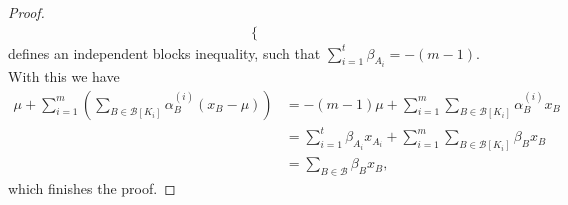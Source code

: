 \documentclass[10pt,a4paper]{amsart}
\newcommand{\B}{\mathcal{B}}
\begin{document}
\begin{proof}
\begin{align*}
\begin{cases}
        \end{cases}
    \end{align*}
	defines an independent blocks inequality, such that $\sum_{i=1}^t \beta_{A_i}=-(m-1)$. With this we have
    \begin{align*}
        \mu+\sum_{i=1}^m \left(\sum_{B \in \B[K_i]} \alpha^{(i)}_B(x_B-\mu)\right)&=-(m-1)\mu+\sum_{i=1}^m\sum_{B \in \B[K_i]} \alpha^{(i)}_Bx_B \\
        &=\sum_{i=1}^t \beta_{A_i}x_{A_i}+\sum_{i=1}^m\sum_{B \in \B[K_i]} \beta_Bx_B  \\
        &=\sum_{B \in \B}\beta_Bx_B,
    \end{align*}
	which finishes the proof.
\end{proof}
\end{document}
